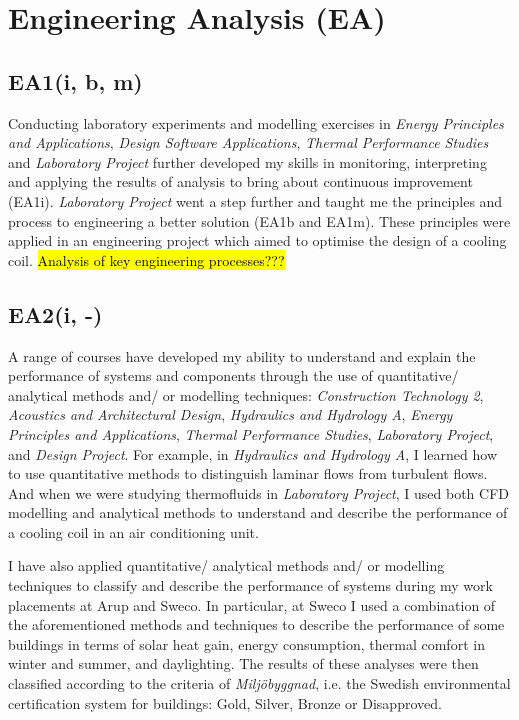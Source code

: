 \section{Engineering Analysis (EA)} \label{EA}

\subsection*{EA1(i, b, m)}

Conducting laboratory experiments and modelling exercises in \textit{Energy Principles and Applications}, \textit{Design Software Applications}, \textit{Thermal Performance Studies} and \textit{Laboratory Project} further developed my skills in monitoring, interpreting and applying the results of analysis to bring about continuous improvement (EA1i).
\textit{Laboratory Project} went a step further and taught me the principles and process to engineering a better solution (EA1b and EA1m).
These principles were applied in an engineering project which aimed to optimise the design of a cooling coil.
\hl{Analysis of key engineering processes???}


\subsection*{EA2(i, -)}

A range of courses have developed my ability to understand and explain the performance of systems and components through the use of quantitative/ analytical methods and/ or modelling techniques:
\textit{Construction Technology 2},
\textit{Acoustics and Architectural Design},
\textit{Hydraulics and Hydrology A},
\textit{Energy Principles and Applications},
\textit{Thermal Performance Studies},
\textit{Laboratory Project},
and \textit{Design Project}.
For example, in \textit{Hydraulics and Hydrology A}, I learned how to use quantitative methods to distinguish laminar flows from turbulent flows.
And when we were studying thermofluids in \textit{Laboratory Project}, I used both CFD modelling and analytical methods to understand and describe the performance of a cooling coil in an air conditioning unit.

I have also applied quantitative/ analytical methods and/ or modelling techniques to classify and describe the performance of systems during my work placements at Arup and Sweco.
In particular, at Sweco I used a combination of the aforementioned methods and techniques to describe the performance of some buildings in terms of solar heat gain, energy consumption, thermal comfort in winter and summer, and daylighting.
The results of these analyses were then classified according to the criteria of \textit{Miljöbyggnad}, i.e. the Swedish environmental certification system for buildings: Gold, Silver, Bronze or Disapproved.


